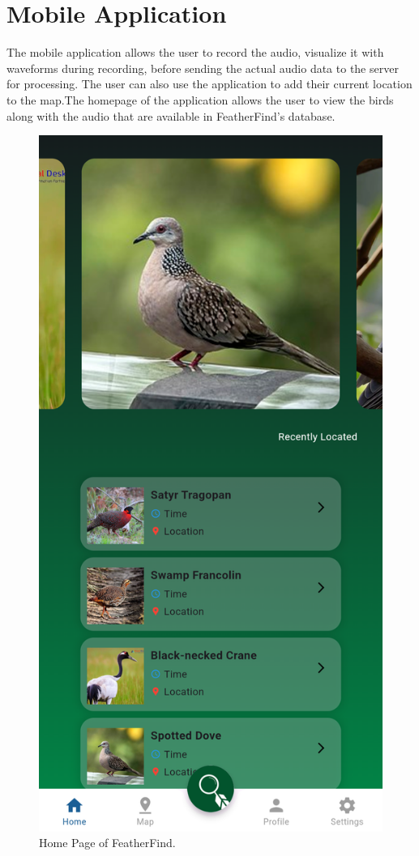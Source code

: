 \section{Mobile Application}
The mobile application allows the user to record the audio, visualize it with
waveforms during recording, before sending the actual audio data to the server
for processing. The user can also use the application to add their current
location to the map.The homepage of the application allows the user to view the birds along with 
the audio that are available in FeatherFind's database.
\begin{figure}[h!]
    \centering
    \includegraphics[scale=0.18]{images/Homepage.png}
    \caption{Home Page of FeatherFind.}
\end{figure}
